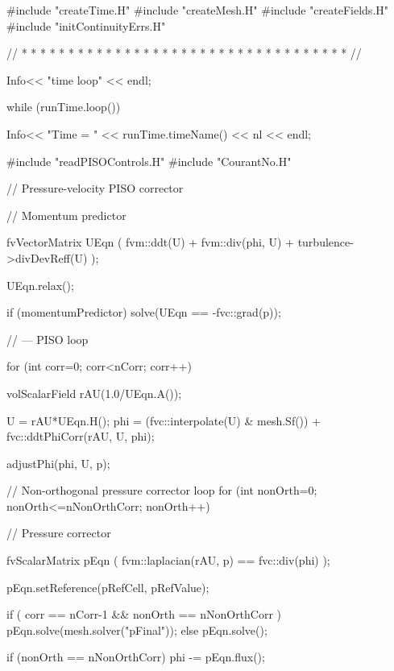 \begin{OFverbatim}
{    #include "createTime.H"
    #include "createMesh.H"
    #include "createFields.H"
    #include "initContinuityErrs.H"

    // * * * * * * * * * * * * * * * * * * * * * * * * * * * * * * * * * * * //

    Info<< "\nStarting time loop\n" << endl;

    while (runTime.loop())
    {
        Info<< "Time = " << runTime.timeName() << nl << endl;

        #include "readPISOControls.H"
        #include "CourantNo.H"

        // Pressure-velocity PISO corrector
        {
            // Momentum predictor

            fvVectorMatrix UEqn
            (
                fvm::ddt(U)
              + fvm::div(phi, U)
              + turbulence->divDevReff(U)
            );

            UEqn.relax();

            if (momentumPredictor)
            {
                solve(UEqn == -fvc::grad(p));
            }

            // --- PISO loop

            for (int corr=0; corr<nCorr; corr++)
            {
                volScalarField rAU(1.0/UEqn.A());

                U = rAU*UEqn.H();
                phi = (fvc::interpolate(U) & mesh.Sf())
                    + fvc::ddtPhiCorr(rAU, U, phi);

                adjustPhi(phi, U, p);

                // Non-orthogonal pressure corrector loop
                for (int nonOrth=0; nonOrth<=nNonOrthCorr; nonOrth++)
                {
                    // Pressure corrector

                    fvScalarMatrix pEqn
                    (
                        fvm::laplacian(rAU, p) == fvc::div(phi)
                    );

                    pEqn.setReference(pRefCell, pRefValue);

                    if
                    (
                        corr == nCorr-1
                     && nonOrth == nNonOrthCorr
                    )
                    {
                        pEqn.solve(mesh.solver("pFinal"));
                    }
                    else
                    {
                        pEqn.solve();
                    }

                    if (nonOrth == nNonOrthCorr)
                    {
                        phi -= pEqn.flux();
                    }
                }

}}}}
\end{OFverbatim}
